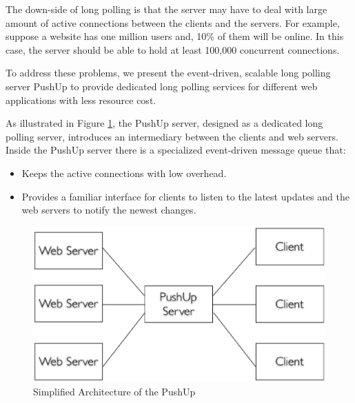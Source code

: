 The down-side of long polling is that the server may have to deal with large
amount of active connections between the clients and the servers. For example,
suppose a website has one million users and, 10\% of them will be online. In this case,
the server should be able to hold at least 100,000 concurrent connections.

To address these problems, we present the event-driven\cite{UnixBook}, scalable
long polling server PushUp to provide dedicated long polling services for 
different web applications with less resource cost.

As illustrated in Figure \ref{fig:sim_pushup}, the PushUp server, designed
as a dedicated long polling server, introduces an intermediary between
the clients and web servers. Inside the PushUp server there is a specialized 
event-driven message queue that:
\begin {itemize}
    \item[1] Keeps the active connections with low overhead.
    \item[2] Provides a familiar interface for clients to listen to the latest 
             updates and the web servers to notify the newest changes.
\end {itemize}


\begin{figure}[htb!]
\centering
    \includegraphics[scale=0.40]{figures/sim_pushup.eps}
    \caption{Simplified Architecture of the PushUp}
    \label{fig:sim_pushup}
\end{figure}
